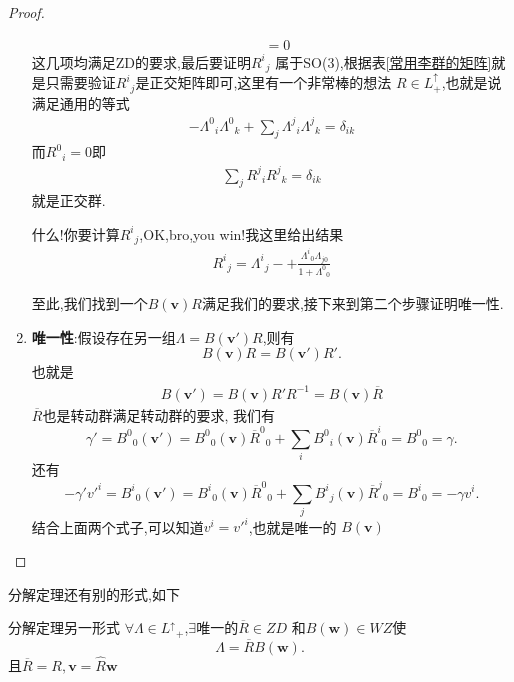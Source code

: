 \documentclass[../main.tex]{subfiles}
\begin{document}
\begin{proof}
\begin{enumerate}
\begin{align*}
			                                                     & =0
		      \end{align*}
		      这几项均满足ZD的要求,最后要证明$R^{i}{}_{j}$ 属于SO(3),根据表\ref{常用李群的矩阵}就是只需要验证$R^{i}{}_{j}$是正交矩阵即可,这里有一个非常棒的想法
		      $R \in L^\uparrow_+$,也就是说满足通用的等式
		      \begin{align*}
			      -\Lambda^{0}{}_{i}\Lambda^{0}{}_{k} + \sum_{j} \Lambda^{j}{}_{i}\Lambda^{j}{}_{k} = \delta_{ik}
		      \end{align*}
		      而$R^{0}{}_{i} = 0$即
		      \begin{align*}
			      \sum_{j} R^{j}{}_{i}R^{j}{}_{k} = \delta_{ik}
		      \end{align*}
		      就是正交群.
		      \begin{note}
			      什么!你要计算$R^{i}{}_{j}$,OK,bro,you win!我这里给出结果
			      \begin{align*}
				      R^{i}{}_{j} = \Lambda^{i}{}_{j} - + \frac{\Lambda^{i}{}_{0}\Lambda_{j0}}{1+ \Lambda^{0}{}_{0}}
			      \end{align*}
		      \end{note}
		      至此,我们找到一个$B(\bm{v})R$满足我们的要求,接下来到第二个步骤证明唯一性.
		\item \textbf{唯一性}:假设存在另一组$\Lambda = B(\bm{v'})R$,则有 \[
			      B(\bm{v}) R = B(\bm{v}') R'
			      .\]
		      也就是
		      \begin{align*}
			      B(\bm{v}') = B(\bm{v})R'R^{-1} = B(\bm{v})\overline{R}
		      \end{align*}
		      $\overline{R}$也是转动群满足转动群的要求,
		      我们有\[
			      \gamma' = B^{0}{}_{0}(\bm{v}') = B^{0}{}_{0}(\bm{v})\overline{R}^{0}{}_{0} + \sum_{i}B^{0}{}_{i}(\bm{v})\overline{R}^{i}{}_{0} = B^{0}{}_{0} = \gamma
			      .\]
		      还有\[
			      -\gamma' v'^i = B^{i}{}_{0}(\bm{v}') = B^{i}{}_{0}(\bm{v}) \overline{R}^{0}{}_{0} + \sum_j B^{i}{}_{j}(\bm{v})\overline{R}^{j}{}_{0} = B^{i}{}_{0} = -\gamma v^i
			      .\]
		      结合上面两个式子,可以知道$v^i = v'^i$,也就是唯一的 $B(\bm{v})$
	\end{enumerate}
\end{proof}
分解定理还有别的形式,如下
\begin{theorem*}{分解定理另一形式}
	$\forall \Lambda \in L^{\uparrow}{}_{+}$,$\exists $唯一的$\overline{R} \in ZD$ 和$B(\bm{w}) \in  WZ$使\[
		\Lambda = \overline{R}B(\bm{w})
		.\]
	且$\overline{R} = R,\bm{v} = \hat{R}\bm{w}$
\end{theorem*}
\end{document}
